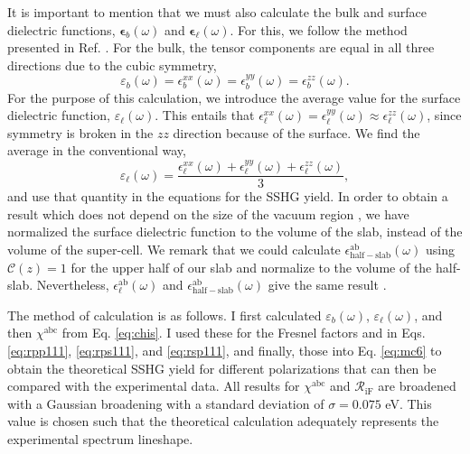 {\color{red}
It is important to mention that we must also calculate the bulk and surface
dielectric functions, $\boldsymbol{\epsilon}_b(\omega)$ and
$\boldsymbol{\epsilon}_\ell(\omega)$. For this, we follow the method presented
in Ref. \cite{mendozaPRB06}. For the bulk, the tensor components are equal in
all three directions due to the cubic symmetry,
\begin{equation*}
\varepsilon_{b}(\omega) = 
\epsilon^{xx}_{b}(\omega) = 
\epsilon^{yy}_{b}(\omega) = 
\epsilon^{zz}_{b}(\omega).
\end{equation*}
For the purpose of this calculation, we introduce the average value for the
surface dielectric function, $\varepsilon_\ell(\omega)$. This entails that
$\epsilon^{xx}_{\ell}(\omega) = \epsilon^{yy}_{\ell}(\omega) \approx
\epsilon^{zz}_{\ell}(\omega)$, since symmetry is broken in the $zz$ direction
because of the surface. We find the average in the conventional way,
\begin{equation*}
\varepsilon_{\ell}(\omega) = 
\frac{\epsilon^{xx}_{\ell}(\omega) + 
\epsilon^{yy}_{\ell}(\omega) + 
\epsilon^{zz}_{\ell}(\omega)}{3},
\end{equation*}
and use that quantity in the equations for the SSHG yield. In order to obtain a
result which does not depend on the size of the vacuum region
\cite{nicolasPRB15}, we have normalized the surface dielectric function to the
volume of the slab, instead of the volume of the super-cell. We remark that we
could calculate $\epsilon^{\mathrm{ab}}_{\mathrm{half-slab}}(\omega)$ using
${\mathcal{C}}(z)=1$ for the upper half of our slab and normalize to the volume
of the half-slab. Nevertheless, $\epsilon^{\mathrm{ab}}_{\ell}(\omega)$ and
$\epsilon^{\mathrm{ab}}_{\mathrm{half-slab}}(\omega)$ give the same
result \cite{hoganPRB03, castilloPRB03, nicolasPRB15}.}

The method of calculation is as follows. I first calculated
$\varepsilon_{b}(\omega)$, $\varepsilon_{\ell}(\omega)$, and then
$\chi^{\mathrm{abc}}$ from Eq. \eqref{eq:chis}. I used these for the Fresnel
factors and in Eqs. \eqref{eq:rpp111}, \eqref{eq:rps111}, and \eqref{eq:rsp111},
and finally, those into Eq. \eqref{eq:mc6} to obtain the theoretical SSHG yield
for different polarizations that can then be compared with the experimental
data. All results for $\chi^{\mathrm{abc}}$ and ${\mathcal R_{\mathrm{iF}}}$ are
broadened with a Gaussian broadening with a standard deviation of $\sigma=0.075$
eV. This value is chosen such that the theoretical calculation adequately
represents the experimental spectrum lineshape.

